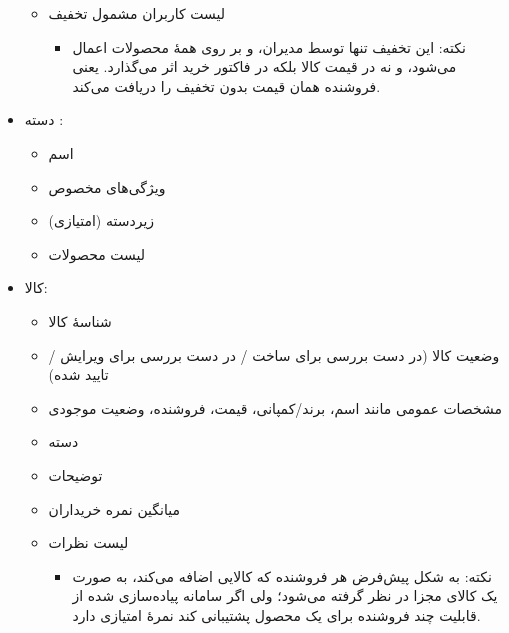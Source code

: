 \documentclass[]{article}
\begin{document}
\begin{itemize}
\begin{itemize}
\item
لیست کاربران مشمول تخفیف


\begin{itemize}[label = {$\blacksquare$}]
\item
نکته:‌ این تخفیف تنها توسط مدیران، و بر روی همهٔ محصولات اعمال می‌شود، و نه در قیمت کالا بلکه در فاکتور خرید اثر می‌گذارد. یعنی فروشنده همان قیمت بدون تخفیف را دریافت می‌کند.
\end{itemize}

\end{itemize}


\newpage

\item
دسته :

\begin{itemize}
\item
اسم

\item
ویژگی‌های مخصوص

\item
زیردسته (امتیازی)

\item
لیست محصولات

\vspace{1cm}


\end{itemize}
\item
کالا:

\begin{itemize}

\item
شناسهٔ کالا 

\item
وضعیت کالا (در دست بررسی برای ساخت / در دست بررسی برای ویرایش / تایید شده)

\item
مشخصات عمومی مانند اسم، برند/کمپانی، قیمت، فروشنده، وضعیت موجودی

\item
دسته

\item
توضیحات

\item
میانگین نمره خریداران

\item
لیست نظرات

\begin{itemize}[label = $\blacksquare$]
\item
نکته: به شکل پیش‌فرض هر فروشنده که کالایی اضافه می‌کند، به صورت یک کالای مجزا در نظر گرفته می‌شود؛ ولی اگر سامانه پیاده‌سازی شده از قابلیت چند فروشنده برای یک محصول پشتیبانی کند نمرهٔ امتیازی دارد.
\end{itemize}


\end{itemize}
\end{itemize}
\end{document}
